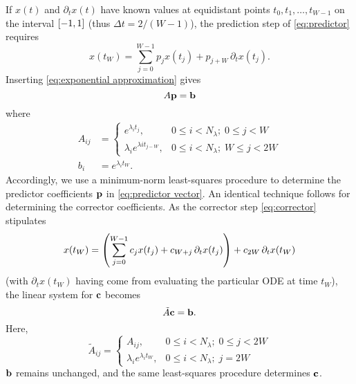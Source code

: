 If $x(t)$ and $\partial_t x(t)$ have known values at equidistant points $t_0, t_1, \ldots, t_{W - 1}$ on the interval $\qty[-1, 1]$ (thus $\Delta t = 2/(W - 1)$), the prediction step of \cref{eq:predictor} requires
\begin{equation}
  x(t_W) = \sum_{j = 0}^{W - 1} p_j x(t_j) + p_{j + W} \, \partial_t x(t_j).
\end{equation}
Inserting \cref{eq:exponential approximation} gives
\begin{equation}
  A \vb{p} = \vb{b}
  \label{eq:predictor vector}
\end{equation}
where
\begin{subequations}
\begin{align}
  A_{ij} &= \begin{cases}
    e^{\lambda_i t_j}, & 0 \leqslant i < N_\lambda; \; 0 \leqslant j < W \\
    \lambda_i e^{\lambda i t_{j - W}}, & 0 \leqslant i < N_\lambda; \; W \leqslant j < 2 W
  \end{cases} \\
  b_i &= e^{\lambda_i t_W}.
\end{align}
\end{subequations}
Accordingly, we use a minimum-norm least-squares procedure to determine the predictor coefficients $\vb{p}$ in \cref{eq:predictor vector}.
An identical technique follows for determining the corrector coefficients.
As the corrector step \cref{eq:corrector} stipulates
\begin{equation}
  x(t_W) = \qty(\sum_{j = 0}^{W - 1} c_j x(t_j) + c_{W + j} \, \partial_t x(t_j)) + c_{2W} \, \partial_t x(t_W)
\end{equation}
(with $\partial_t x(t_W)$ having come from evaluating the particular ODE at time $t_W$), the linear system for $\vb{c}$ becomes
\begin{equation}
  \tilde{A} \vb{c} = \vb{b}.
\end{equation}
Here,
\begin{equation}
  \tilde{A}_{ij} = \begin{cases}
    A_{ij}, & 0 \leqslant i < N_\lambda; \; 0 \leqslant j < 2W \\
    \lambda_i e^{\lambda_i t_W}, & 0 \leqslant i < N_\lambda; \; j = 2W
  \end{cases}
\end{equation}
$\vb{b}$ remains unchanged, and the same least-squares procedure determines $\vb{c}$.

